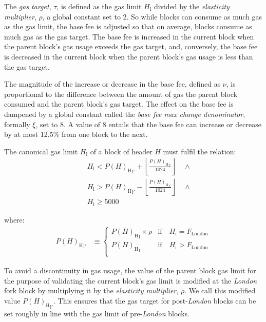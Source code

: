 \documentclass[9pt,oneside]{amsart}
\begin{document}
\begin{multicols}{2}
The \textit{gas target}, $\tau$, is defined as the gas limit $H_{\mathrm{l}}$ divided by the \textit{elasticity multiplier}, $\rho$, a global constant set to 2. So while blocks can consume as much gas as the gas limit, the base fee is adjusted so that on average, blocks consume as much gas as the gas target. The base fee is increased in the current block when the parent block's gas usage exceeds the gas target, and, conversely, the base fee is decreased in the current block when the parent block's gas usage is less than the gas target.

The magnitude of the increase or decrease in the base fee, defined as $\nu$, is proportional to the difference between the amount of gas the parent block consumed and the parent block's gas target.
The effect on the base fee is dampened by a global constant called the \textit{base fee max change denominator}, formally $\xi$, set to 8.
A value of 8 entails that the base fee can increase or decrease by at most 12.5\% from one block to the next.

\hypertarget{block_gas_limit_H__l}{}The canonical gas limit $H_{\mathrm{l}}$ of a block of header $H$ must fulfil the relation:
\begin{eqnarray}
& & H_{\mathrm{l}} < {P(H)_{\mathrm{H}}}_{\mathrm{l}'} + \left\lfloor\frac{{P(H)_{\mathrm{H}}}_{\mathrm{l}'}}{1024}\right\rfloor \quad \wedge \\
\nonumber& & H_{\mathrm{l}} > {P(H)_{\mathrm{H}}}_{\mathrm{l}'} - \left\lfloor\frac{{P(H)_{\mathrm{H}}}_{\mathrm{l}'}}{1024}\right\rfloor \quad \wedge \\
\nonumber& & H_{\mathrm{l}} \geqslant 5000
\end{eqnarray}

where:
  \begin{align}
    {P(H)_{\mathrm{H}}}_{\mathrm{l}'} &\equiv \begin{cases}
      {P(H)_{\mathrm{H}}}_{\mathrm{l}} \times \rho &  \text{if} \quad H_{\mathrm{i}} = F_{\mathrm{London}} \\
      {P(H)_{\mathrm{H}}}_{\mathrm{l}} &  \text{if} \quad H_{\mathrm{i}} > F_{\mathrm{London}} \\
  \end{cases}
\end{align}

To avoid a discontinuity in gas usage, the value of the parent block gas limit for the purpose of validating the current block's gas limit is modified at the \textit{London} fork block by multiplying it by the \textit{elasticity multiplier}, $\rho$. We call this modified value ${P(H)_{\mathrm{H}}}_{\mathrm{l}'}$. This ensures that the gas target for post-\textit{London} blocks can be set roughly in line with the gas limit of pre-\textit{London} blocks.


\end{multicols}
\end{document}
